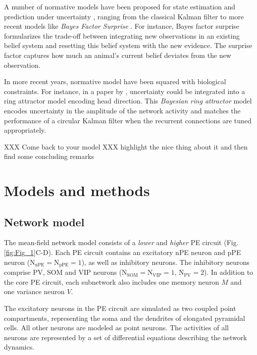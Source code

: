 \documentclass[10pt,a4paper,draft]{article}
\begin{document}
A number of normative models have been proposed for state estimation and prediction under uncertainty \citep{soltani2019adaptive}, ranging from the classical Kalman filter to more recent models like \textit{Bayes Factor Surprise} \citep{liakoni2021learning}. For instance, Bayes factor surprise formularizes the trade-off between integrating new observations in an existing belief system and resetting this belief system with the new evidence. The surprise factor captures how much an animal’s current belief deviates from the new observation. 

In more recent years, normative model have been squared with biological constraints. For instance, in a paper by \citep{kutschireiter2023bayesian}, uncertainty could be integrated into a ring attractor model encoding head direction. This \textit{Bayesian ring attractor} model encodes uncertainty in the amplitude of the network activity and matches the performance of a circular Kalman filter when the recurrent connections are tuned appropriately. 

XXX Come back to your model XXX highlight the nice thing about it and then find some concluding remarks



\section*{Models and methods}
%
\subsection*{Network model}
The mean-field network model consists of a \textit{lower} and \textit{higher} PE circuit (Fig. \ref{fig:Fig_1}C-D). Each PE circuit contains an excitatory nPE neuron and pPE neuron ($\mathrm{N}_\mathrm{nPE} = \mathrm{N}_\mathrm{pPE} = 1$), as well as inhibitory neurons. The inhibitory neurons comprise PV, SOM and VIP neurons ($\mathrm{N}_\mathrm{SOM} = \mathrm{N}_\mathrm{VIP} = 1$, $\mathrm{N}_\mathrm{PV} = 2$). In addition to the core PE circuit, each subnetwork also includes one memory neuron $M$ and one variance neuron $V$. 

The excitatory neurons in the PE circuit are simulated as two coupled point compartments, representing the soma and the dendrites of elongated pyramidal cells. All other neurons are modeled as point neurons. The activities of all neurons are represented by a set of differential equations describing the network dynamics. 
\end{document}
